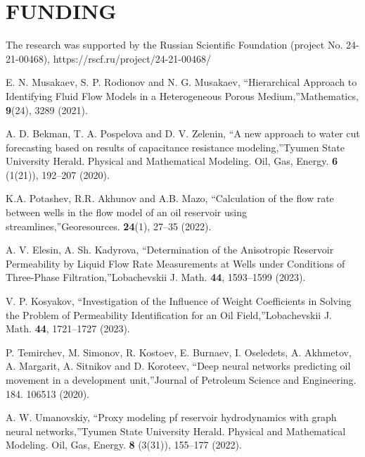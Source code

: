 \documentclass[
11pt,%
tightenlines,%
twoside,%
onecolumn,%
nofloats,%
nobibnotes,%
nofootinbib,%
superscriptaddress,%
noshowpacs,%
centertags]%
{revtex4}
\begin{document}
\section{FUNDING}
The research was supported by the Russian Scientific Foundation (project No. 24-21-00468), https://rscf.ru/project/24-21-00468/


%

\begin{thebibliography}{99}
 E. N. Musakaev, S. P. Rodionov and N. G. Musakaev, \textquotedblleft Hierarchical Approach to Identifying Fluid Flow Models in a Heterogeneous Porous Medium,\textquotedblright Mathematics, {\bf 9}(24), 3289 (2021).

 A. D. Bekman, T. A. Pospelova and D. V. Zelenin, \textquotedblleft A new approach to water cut forecasting based on results of capacitance resistance modeling,\textquotedblright Tyumen State University Herald. Physical and Mathematical Modeling. Oil, Gas, Energy. {\bf 6} (1(21)), 192--207 (2020).

 K.A. Potashev, R.R. Akhunov and  A.B. Mazo, \textquotedblleft Calculation of the flow rate between wells in the flow model of an oil reservoir using streamlines,\textquotedblright Georesources. {\bf 24}(1), 27--35 (2022).

 A. V. Elesin, A. Sh. Kadyrova, \textquotedblleft Determination of the Anisotropic Reservoir Permeability by Liquid Flow Rate Measurements at Wells under Conditions of Three-Phase Filtration,\textquotedblright Lobachevskii J. Math.
{\bf 44}, 1593--1599 (2023).

 V. P. Kosyakov, \textquotedblleft Investigation of the Influence of Weight Coefficients in Solving the Problem of Permeability Identification for an Oil Field,\textquotedblright Lobachevskii J. Math.
{\bf 44}, 1721--1727 (2023).

P. Temirchev, M. Simonov, R. Kostoev, E. Burnaev, I. Oseledets, A. Akhmetov, A. Margarit, A. Sitnikov and D. Koroteev, \textquotedblleft Deep neural networks predicting oil movement in a development unit,\textquotedblright Journal of Petroleum Science and Engineering. 184. 106513 (2020).

A. W. Umanovskiy, \textquotedblleft Proxy modeling pf reservoir hydrodynamics with graph neural networks,\textquotedblright Tyumen State University Herald. Physical and Mathematical Modeling. Oil, Gas, Energy. {\bf 8} (3(31)), 155--177 (2022).


\end{thebibliography}
\end{document}
